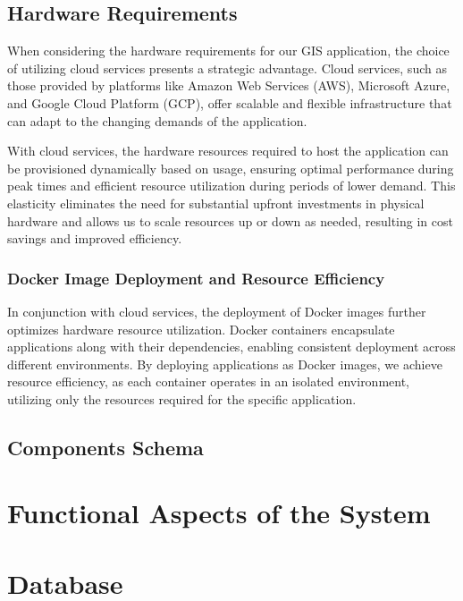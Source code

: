 \subsection{Hardware Requirements}\label{subsec:hardware-requirements}
When considering the hardware requirements for our GIS application, the choice of utilizing cloud services presents a strategic advantage. Cloud services, such as those provided by platforms like Amazon Web Services (AWS), Microsoft Azure, and Google Cloud Platform (GCP), offer scalable and flexible infrastructure that can adapt to the changing demands of the application.

With cloud services, the hardware resources required to host the application can be provisioned dynamically based on usage, ensuring optimal performance during peak times and efficient resource utilization during periods of lower demand. This elasticity eliminates the need for substantial upfront investments in physical hardware and allows us to scale resources up or down as needed, resulting in cost savings and improved efficiency.

\subsubsection{Docker Image Deployment and Resource Efficiency}

In conjunction with cloud services, the deployment of Docker images further optimizes hardware resource utilization. Docker containers encapsulate applications along with their dependencies, enabling consistent deployment across different environments. By deploying applications as Docker images, we achieve resource efficiency, as each container operates in an isolated environment, utilizing only the resources required for the specific application. 

\subsection{Components Schema}\label{subsec:components-schema}


\section{Functional Aspects of the System}\label{sec:functional-aspects-of-the-system}

\section{Database}\label{sec:database}
